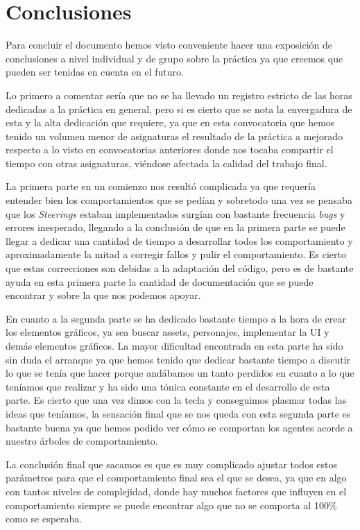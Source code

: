 \section{Conclusiones}

Para concluir el documento hemos visto conveniente hacer una exposición de conclusiones a nivel individual y de grupo sobre la práctica ya que creemos que pueden ser tenidas en cuenta en el futuro.

Lo primero a comentar sería que no se ha llevado un registro estricto de las horas dedicadas a la práctica en general, pero si es cierto que se nota la envergadura de esta y la alta dedicación que requiere, ya que en esta convocatoria que hemos tenido un volumen menor de asignaturas el resultado de la práctica a mejorado respecto a lo visto en convocatorias anteriores donde nos tocaba compartir el tiempo con otras asignaturas, viéndose afectada la calidad del trabajo final.

La primera parte en un comienzo nos resultó complicada ya que requería entender bien los comportamientos que se pedían y sobretodo una vez se pensaba que los \textit{Steerings} estaban implementados surgían con bastante frecuencia \textit{bugs} y errores inesperado, llegando a la conclusión de que en la primera parte se puede llegar a dedicar una cantidad de tiempo a desarrollar todos los comportamiento y aproximadamente la mitad a corregir fallos y pulir el comportamiento. Es cierto que estas correcciones son debidas a la adaptación del código, pero es de bastante ayuda en esta primera parte la cantidad de documentación que se puede encontrar y sobre la que nos podemos apoyar.

En cuanto a la segunda parte se ha dedicado bastante tiempo a la hora de crear los elementos gráficos, ya sea buscar assets, personajes, implementar la UI y demás elementos gráficos. La mayor dificultad encontrada en esta parte ha sido sin duda el arranque ya que hemos tenido que dedicar bastante tiempo a discutir lo que se tenía que hacer porque andábamos un tanto perdidos en cuanto a lo que teníamos que realizar y ha sido una tónica constante en el desarrollo de esta parte. Es cierto que una vez dimos con la tecla y conseguimos plasmar todas las ideas que teníamos, la sensación final que se nos queda con esta segunda parte es bastante buena ya que hemos podido ver cómo se comportan los agentes acorde a nuestro árboles de comportamiento.

La conclusión final que sacamos es que es muy complicado ajustar todos estos parámetros para que el comportamiento final sea el que se desea, ya que en algo con tantos niveles de complejidad, donde hay muchos factores que influyen en el comportamiento siempre se puede encontrar algo que no se comporta al 100\% como se esperaba.